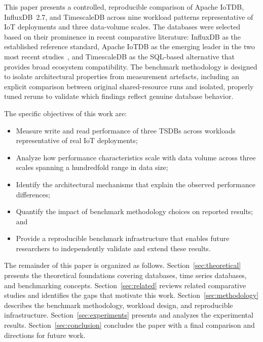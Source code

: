 This paper presents a controlled, reproducible comparison of Apache IoTDB, InfluxDB~2.7,
and TimescaleDB across nine workload patterns representative of IoT deployments and three
data-volume scales. The databases were selected based on their prominence in recent comparative
literature: InfluxDB as the established reference standard, Apache IoTDB as the emerging leader
in the two most recent studies~\citep{pereira2023mulletbench,wang2023iotdb}, and TimescaleDB as
the SQL-based alternative that provides broad ecosystem compatibility. The benchmark methodology
is designed to isolate architectural properties from measurement artefacts, including an
explicit comparison between original shared-resource runs and isolated, properly tuned reruns
to validate which findings reflect genuine database behavior.

The specific objectives of this work are:
\begin{itemize}
  \item Measure write and read performance of three TSDBs across workloads representative of
    real IoT deployments;
  \item Analyze how performance characteristics scale with data volume across three scales
    spanning a hundredfold range in data size;
  \item Identify the architectural mechanisms that explain the observed performance differences;
  \item Quantify the impact of benchmark methodology choices on reported results; and
  \item Provide a reproducible benchmark infrastructure that enables future researchers to
    independently validate and extend these results.
\end{itemize}

The remainder of this paper is organized as follows.
Section~\ref{sec:theoretical} presents the theoretical foundations covering databases,
time series databases, and benchmarking concepts.
Section~\ref{sec:related} reviews related comparative studies and identifies the gaps that
motivate this work.
Section~\ref{sec:methodology} describes the benchmark methodology, workload design, and
reproducible infrastructure.
Section~\ref{sec:experiments} presents and analyzes the experimental results.
Section~\ref{sec:conclusion} concludes the paper with a final comparison and directions
for future work.
